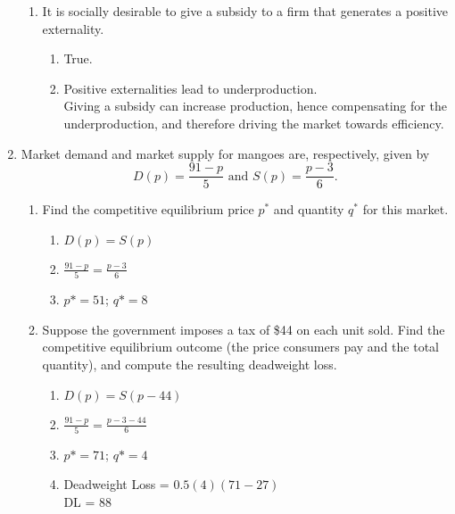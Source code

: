 \documentclass[11pt]{article}
\begin{document}
\begin{enumerate}
\begin{enumerate}
	\item It is socially desirable to give a subsidy to a firm that generates a positive externality.
	\begin{enumerate}
        \item True.
        \item Positive externalities lead to underproduction. \\
        Giving a subsidy can increase production, hence compensating for the underproduction, and therefore driving the market towards efficiency.
    \end{enumerate}
    \end{enumerate}
\pagebreak
\item Market demand and market supply for mangoes are, respectively, given by
    \begin{equation*}
        D(p)=\frac{91-p}{5}\text{ and }S(p)=\frac{p-3}{6}.
    \end{equation*}
    \begin{enumerate}
        \item Find the competitive equilibrium price $p^{\ast}$ and quantity $q^{\ast}$ for this market.
        \begin{enumerate}
            \item $D(p)=S(p)$
            \item $\frac{91-p}{5}=\frac{p-3}{6}$
            \item $p* = 51$; $q* = 8$
        \end{enumerate}

        \item Suppose the government imposes a tax of \$44 on each unit sold. Find the competitive equilibrium outcome (the price consumers pay and the total quantity), and compute the resulting deadweight loss.
        \begin{enumerate}
            \item $D(p)=S(p-44)$
            \item $\frac{91-p}{5}=\frac{p-3-44}{6}$
            \item $p* = 71$; $q* = 4$
            \item Deadweight Loss = $0.5(4)(71-27)$\\
            DL = 88
        \end{enumerate}


\end{enumerate}
\end{enumerate}
\end{document}
